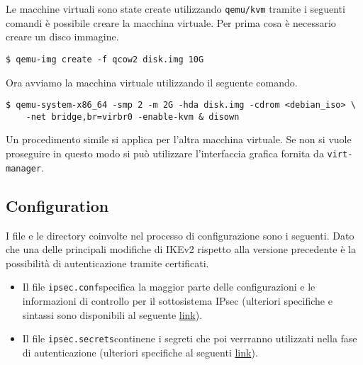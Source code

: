 \documentclass[
10pt, %
a4paper, %
oneside, %
headinclude,footinclude, %
BCOR5mm, %
]{scrartcl}
\begin{document}
\noindent
Le macchine virtuali sono state create utilizzando \lstinline|qemu/kvm| tramite i seguenti comandi è possibile creare la macchina virtuale.
\newline\newline\noindent
Per prima cosa è necessario creare un disco immagine.
\begin{lstlisting}
$ qemu-img create -f qcow2 disk.img 10G 
\end{lstlisting}
\vspace*{0.2cm}
Ora avviamo la macchina virtuale utilizzando il seguente comando.
\begin{lstlisting}
$ qemu-system-x86_64 -smp 2 -m 2G -hda disk.img -cdrom <debian_iso> \
    -net bridge,br=virbr0 -enable-kvm & disown
\end{lstlisting}

\vspace*{0.5cm}
\noindent
Un procedimento simile si applica per l'altra macchina virtuale. Se non si vuole proseguire in questo modo 
si può utilizzare l'interfaccia grafica fornita da \lstinline|virt-manager|.



\subsection{Configuration} 

I file e le directory coinvolte nel processo di configurazione sono i seguenti. Dato che una delle principali modifiche di IKEv2 
rispetto alla versione precedente è la possibilità di autenticazione tramite certificati.
\\

    
\begin{itemize}
    \item Il file \lstinline|ipsec.conf|\footnotemark[1] specifica la maggior parte delle configurazioni e le informazioni di controllo per il sottosistema IPsec (ulteriori specifiche e sintassi sono disponibili al seguente \href{https://linux.die.net/man/5/ipsec.conf}{link}).
    \item Il file \lstinline|ipsec.secrets|\footnotemark[1] continene i segreti che poi verrranno utilizzati nella fase di autenticazione (ulteriori specifiche al seguenti \href{https://linux.die.net/man/5/ipsec.secrets}{link}).
\end{itemize}
\end{document}

